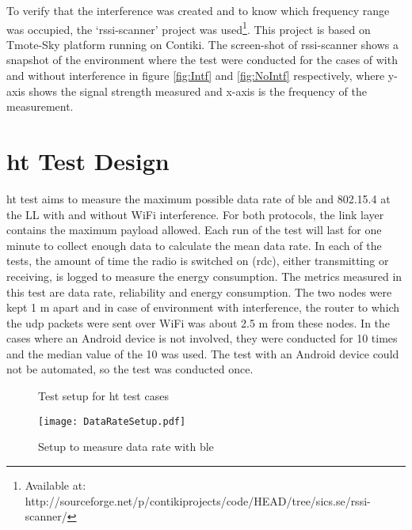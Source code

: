 To verify that the interference was created and to know which frequency range was occupied, the `rssi-scanner' project was used\footnote{Available at: http://sourceforge.net/p/contikiprojects/code/HEAD/tree/sics.se/rssi-scanner/}. This project is based on Tmote-Sky platform running on Contiki. The screen-shot of rssi-scanner shows a snapshot of the environment where the test were conducted for the cases of with and without interference in figure \ref{fig:Intf} and \ref{fig:NoIntf} respectively, where y-axis shows the signal strength measured and x-axis is the frequency of the measurement.



\section{\acrfull{ht} Test Design} \label{6HTdesign}
\gls{ht} test aims to measure the maximum possible data rate of \gls{ble} and 802.15.4 at the LL with and without WiFi interference. For both protocols, the link layer contains the maximum payload allowed. Each run of the test will last for one minute to collect enough data to calculate the mean data rate. In each of the tests, the amount of time the radio is switched on (\gls{rdc}), either transmitting or receiving, is logged to measure the energy consumption. The metrics measured in this test are data rate, reliability and energy consumption. The two nodes were kept 1 m apart and in case of environment with interference, the router to which the \gls{udp} packets were sent over WiFi was about 2.5 m from these nodes. In the cases where an Android device is not involved, they were conducted for 10 times and the median value of the 10 was used. The test with an Android device could not be automated, so the test was conducted once.

\begin{figure}[h]
\def\svgwidth{\columnwidth}

\caption{Test setup for \gls{ht} test cases}
\label{fig:layout}
\end{figure}

\begin{wrapfigure}{r}{0.53\textwidth}
	\vspace{-20pt}
	\centering
	\texttt{[image: DataRateSetup.pdf]}
	\caption{Setup to measure data rate with \gls{ble}}
    \label{fig:DataRateSetup}
\end{wrapfigure}

